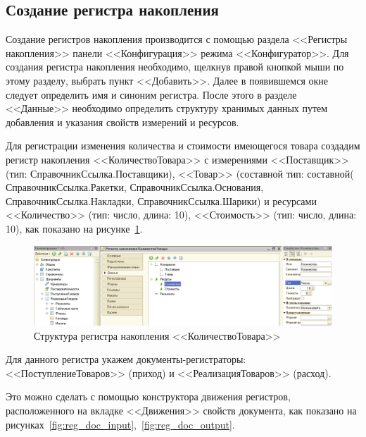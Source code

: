 \pagebreak

\subsection{Создание регистра накопления}

Создание регистров накопления производится с помощью раздела
<<Регистры накопления>> панели <<Конфигурация>> режима <<Конфигуратор>>.
Для создания регистра накопления необходимо,
щелкнув правой кнопкой мыши по этому
разделу, выбрать пункт <<Добавить>>. Далее в появившемся окне
следует определить имя и синоним регистра.
После этого в разделе <<Данные>> необходимо определить структуру
хранимых данных путем добавления и указания свойств измерений и ресурсов.

Для регистрации изменения количества и стоимости имеющегося товара
создадим регистр накопления <<КоличествоТовара>> с измерениями
<<Поставщик>> (тип: СправочникСсылка.Поставщики),
<<Товар>> (составной тип: составной(%
  СправочникСсылка.Ракетки,
  СправочникСсылка.Основания,
  СправочникСсылка.Накладки,
  СправочникСсылка.Шарики)
и ресурсами
<<Количество>> (тип: число, длина: 10),
<<Стоимость>> (тип: число, длина: 10),
как показано на рисунке~\ref{fig:reg_structure}.

\begin{figure}[h!]
  \centering
  \includegraphics[width=150mm]{pic/reg_structure}
  \caption{Структура регистра накопления <<КоличествоТовара>>}
  \label{fig:reg_structure}
\end{figure}

Для данного регистра укажем документы-регистраторы:
<<ПоступлениеТоваров>> (приход) и
<<РеализацияТоваров>> (расход).

Это можно сделать с помощью конструктора движения регистров,
расположенного на вкладке <<Движения>> свойств документа,
как показано на рисунках~\ref{fig:reg_doc_input},~\ref{fig:reg_doc_output}.

